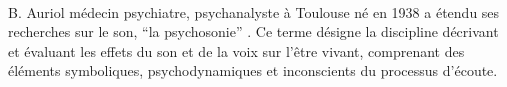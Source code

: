   \\
    B. Auriol médecin psychiatre,
   psychanalyste à Toulouse né en 1938
a étendu ses recherches sur le son, %
\enquote {la psychosonie} \autocite{auriol:cle}. Ce terme
désigne la discipline décrivant et évaluant les effets du
son et de la voix sur l'être vivant, comprenant des éléments
symboliques, psychodynamiques et inconscients du processus
d'écoute. 
